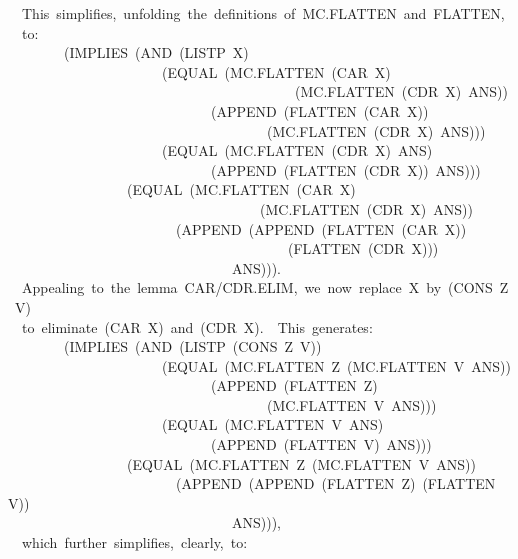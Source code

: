 \documentclass[10pt]{book}
\newenvironment{pubasis}{\begin{flushleft}}{\end{flushleft}}
\begin{document}
\begin{pubasis}
~~This~simplifies,~unfolding~the~definitions~of~MC.FLATTEN~and~FLATTEN,\\
~~to:\\

~~~~~~~~(IMPLIES~(AND~(LISTP~X)\\
~~~~~~~~~~~~~~~~~~~~~~(EQUAL~(MC.FLATTEN~(CAR~X)\\
~~~~~~~~~~~~~~~~~~~~~~~~~~~~~~~~~~~~~~~~~(MC.FLATTEN~(CDR~X)~ANS))\\
~~~~~~~~~~~~~~~~~~~~~~~~~~~~~(APPEND~(FLATTEN~(CAR~X))\\
~~~~~~~~~~~~~~~~~~~~~~~~~~~~~~~~~~~~~(MC.FLATTEN~(CDR~X)~ANS)))\\
~~~~~~~~~~~~~~~~~~~~~~(EQUAL~(MC.FLATTEN~(CDR~X)~ANS)\\
~~~~~~~~~~~~~~~~~~~~~~~~~~~~~(APPEND~(FLATTEN~(CDR~X))~ANS)))\\
~~~~~~~~~~~~~~~~~(EQUAL~(MC.FLATTEN~(CAR~X)\\
~~~~~~~~~~~~~~~~~~~~~~~~~~~~~~~~~~~~(MC.FLATTEN~(CDR~X)~ANS))\\
~~~~~~~~~~~~~~~~~~~~~~~~(APPEND~(APPEND~(FLATTEN~(CAR~X))\\
~~~~~~~~~~~~~~~~~~~~~~~~~~~~~~~~~~~~~~~~(FLATTEN~(CDR~X)))\\
~~~~~~~~~~~~~~~~~~~~~~~~~~~~~~~~ANS))).\\

~~Appealing~to~the~lemma~CAR/CDR.ELIM,~we~now~replace~X~by~(CONS~Z~V)\\
~~to~eliminate~(CAR~X)~and~(CDR~X).~~This~generates:\\

~~~~~~~~(IMPLIES~(AND~(LISTP~(CONS~Z~V))\\
~~~~~~~~~~~~~~~~~~~~~~(EQUAL~(MC.FLATTEN~Z~(MC.FLATTEN~V~ANS))\\
~~~~~~~~~~~~~~~~~~~~~~~~~~~~~(APPEND~(FLATTEN~Z)\\
~~~~~~~~~~~~~~~~~~~~~~~~~~~~~~~~~~~~~(MC.FLATTEN~V~ANS)))\\
~~~~~~~~~~~~~~~~~~~~~~(EQUAL~(MC.FLATTEN~V~ANS)\\
~~~~~~~~~~~~~~~~~~~~~~~~~~~~~(APPEND~(FLATTEN~V)~ANS)))\\
~~~~~~~~~~~~~~~~~(EQUAL~(MC.FLATTEN~Z~(MC.FLATTEN~V~ANS))\\
~~~~~~~~~~~~~~~~~~~~~~~~(APPEND~(APPEND~(FLATTEN~Z)~(FLATTEN~V))\\
~~~~~~~~~~~~~~~~~~~~~~~~~~~~~~~~ANS))),\\

~~which~further~simplifies,~clearly,~to:\\


\end{pubasis}
\end{document}
